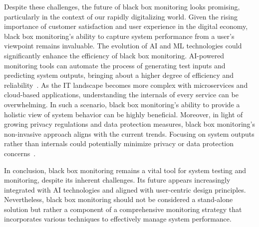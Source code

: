 Despite these challenges, the future of black box monitoring looks promising, particularly in the context of our rapidly digitalizing world. Given the rising importance of customer satisfaction and user experience in the digital economy, black box monitoring's ability to capture system performance from a user's viewpoint remains invaluable. The evolution of \ac{AI} and \ac{ML} technologies could significantly enhance the efficiency of black box monitoring. AI-powered monitoring tools can automate the process of generating test inputs and predicting system outputs, bringing about a higher degree of efficiency and reliability~\parencite{bertolino_software_2003}. As the IT landscape becomes more complex with microservices and cloud-based applications, understanding the internals of every service can be overwhelming. In such a scenario, black box monitoring's ability to provide a holistic view of system behavior can be highly beneficial. Moreover, in light of growing privacy regulations and data protection measures, black box monitoring's non-invasive approach aligns with the current trends. Focusing on system outputs rather than internals could potentially minimize privacy or data protection concerns~\parencite{otto_addressing_2007}.

In conclusion, black box monitoring remains a vital tool for system testing and monitoring, despite its inherent challenges. Its future appears increasingly integrated with AI technologies and aligned with user-centric design principles. Nevertheless, black box monitoring should not be considered a stand-alone solution but rather a component of a comprehensive monitoring strategy that incorporates various techniques to effectively manage system performance.